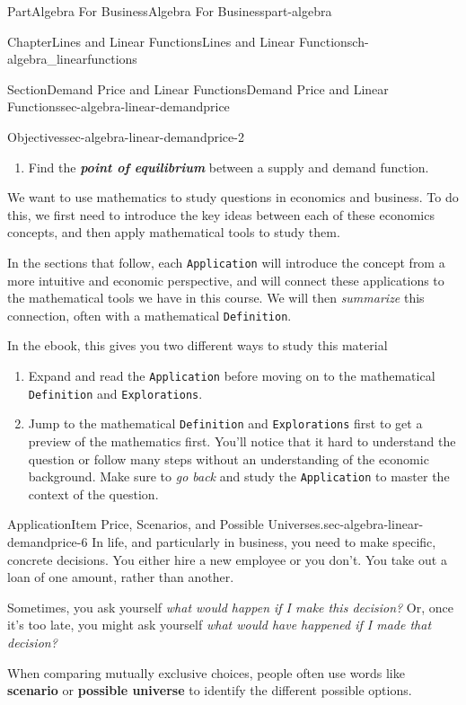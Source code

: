 \documentclass{tufte-book}
\newcommand{\mono}[1]{\texttt{#1}}
\newcommand{\alert}[1]{\textbf{\textit{#1}}}
\newcommand{\terminology}[1]{\textbf{#1}}
\numberwithin{equation}{chapter}
\begin{document}
\begin{partptx}{Part}{Algebra For Business}{}{Algebra For Business}{}{}{part-algebra}
\begin{chapterptx}{Chapter}{Lines and Linear Functions}{}{Lines and Linear Functions}{}{}{ch-algebra_linearfunctions}
\begin{sectionptx}{Section}{Demand Price and Linear Functions}{}{Demand Price and Linear Functions}{}{}{sec-algebra-linear-demandprice}
\begin{objectives}{Objectives}{sec-algebra-linear-demandprice-2}
\begin{enumerate}
\item{}Find the \alert{point of equilibrium} between a supply and demand function.%
\end{enumerate}
\end{objectives}
We want to use mathematics to study questions in economics and business. To do this, we first need to introduce the key ideas between each of these economics concepts, and then apply mathematical tools to study them.%
\par
In the sections that follow, each \mono{Application} will introduce the concept from a more intuitive and economic perspective, and will connect these applications to the mathematical tools we have in this course. We will then \emph{summarize} this connection, often with a mathematical \mono{Definition}.%
\par
In the ebook, this gives you two different ways to study this material%
\begin{enumerate}
\item{}Expand and read the \mono{Application} before moving on to the mathematical \mono{Definition} and \mono{Explorations}.%
\item{}Jump to the mathematical \mono{Definition} and \mono{Explorations} first to get a preview of the mathematics first. You'll notice that it hard to understand the question or follow many steps without an understanding of the economic background. Make sure to \emph{go back} and study the \mono{Application} to master the context of the question.%
\end{enumerate}
%
\begin{insight}{Application}{Item Price, Scenarios, and Possible Universes.}{sec-algebra-linear-demandprice-6}%
In life, and particularly in business, you need to make specific, concrete decisions. You either hire a new employee or you don't. You take out a loan of one amount, rather than another.%
\par
Sometimes, you ask yourself \emph{what would happen if I make this decision?} Or, once it's too late, you might ask yourself \emph{what would have happened if I made that decision?}%
\par
When comparing mutually exclusive choices, people often use words like \terminology{scenario} or \terminology{possible universe} to identify the different possible options.%
\par

\end{insight}
\end{sectionptx}
\end{chapterptx}
\end{partptx}
\end{document}
